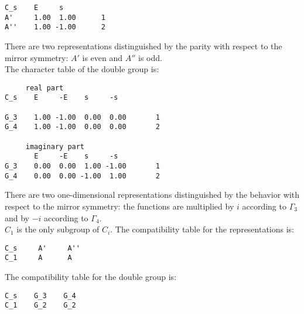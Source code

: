 \documentclass[12pt,a4paper,twoside]{report}
\begin{document}
\begin{tcolorbox}
\begin{footnotesize}
\begin{verbatim}
C_s    E     s
A'     1.00  1.00      1
A''    1.00 -1.00      2
\end{verbatim}
\end{footnotesize}
\end{tcolorbox}

There are two representations distinguished by the parity
with respect to the mirror symmetry: $A'$ is even and $A''$ is odd.\\
The character table of the double group is:

\begin{tcolorbox}
\begin{footnotesize}
\begin{verbatim}
     real part
C_s    E     -E    s     -s   
                              
G_3    1.00 -1.00  0.00  0.00       1 
G_4    1.00 -1.00  0.00  0.00       2

     imaginary part
       E     -E    s     -s   
G_3    0.00  0.00  1.00 -1.00       1
G_4    0.00  0.00 -1.00  1.00       2
\end{verbatim}
\end{footnotesize}
\end{tcolorbox}

There are two one-dimensional representations distinguished by the 
behavior with respect to the mirror symmetry: the functions
are multiplied by $i$ according to $\Gamma_3$ and by
$-i$ according to $\Gamma_4$.\\
$C_1$ is the only subgroup of $C_i$. The compatibility table for the
representations is:

\begin{tcolorbox}
\begin{footnotesize}
\begin{verbatim}
C_s     A'     A''
C_1     A      A
\end{verbatim}
\end{footnotesize}
\end{tcolorbox}

The compatibility table for the double group is:

\begin{tcolorbox}
\begin{footnotesize}
\begin{verbatim}
C_s    G_3    G_4 
C_1    G_2    G_2
\end{verbatim}
\end{footnotesize}
\end{tcolorbox}
\end{document}

